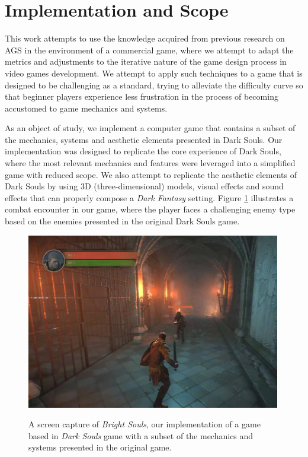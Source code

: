 
\section{Implementation and Scope}

This work attempts to use the knowledge acquired from previous research on AGS in the environment of a commercial game, where we attempt to adapt the metrics and adjustments to the iterative nature of the game design process in video games development. We attempt to apply such techniques to a game that is designed to be challenging as a standard, trying to alleviate the difficulty curve so that beginner players experience less frustration in the process of becoming accustomed to game mechanics and systems.

As an object of study, we implement a computer game that contains a subset of the mechanics, systems and aesthetic elements presented in Dark Souls. Our implementation was designed to replicate the core experience of Dark Souls, where the most relevant mechanics and features were leveraged into a simplified game with reduced scope. We also attempt to replicate the aesthetic elements of Dark Souls by using 3D (three-dimensional) models, visual effects and sound effects that can properly compose a \emph{Dark Fantasy} setting. Figure \ref{fig:implementation-bright-souls} illustrates a combat encounter in our game, where the player faces a challenging enemy type based on the enemies presented in the original Dark Souls game.

\begin{figure}[!ht]
    \begin{center}
    \caption{A screen capture of \emph{Bright Souls}, our implementation of a game based in \emph{Dark Souls} game with a subset of the mechanics and systems presented in the original game.}
        \includegraphics[width=30em]{figures/fig-bright-souls.jpg}
        \label{fig:implementation-bright-souls}
    \end{center}
\end{figure}

